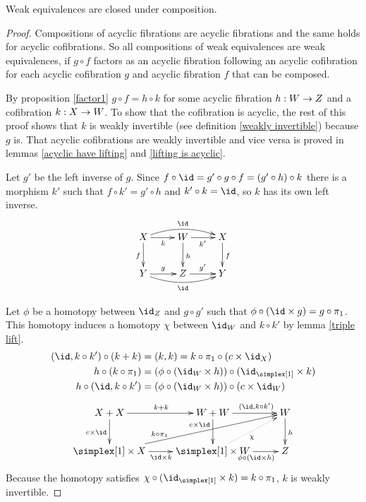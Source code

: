 \documentclass[csh.tex]{subfiles}
\begin{document}
\begin{lemma} Weak equivalences are closed under composition. \label{composition of weak equivalences}\end{lemma}

\begin{proof} Compositions of acyclic fibrations are acyclic fibrations and the same holds for acyclic cofibrations.
So all compositions of weak equivalences are weak equivalences, if $g\circ f$ factors as an acyclic fibration following an acyclic cofibration for each acyclic cofibration $g$ and acyclic fibration $f$ that can be composed.

By proposition \ref{factor1} $g\circ f=h\circ k$ for some acyclic fibration $h: W\to Z$ and a cofibration $k: X\to W$. To show that the cofibration is acyclic, the rest of this proof shows that $k$ is weakly invertible (see definition \ref{weakly invertible}) because $g$ is. That acyclic cofibrations are weakly invertible and vice versa is proved in lemmas \ref{acyclic have lifting} and \ref{lifting is acyclic}.

Let $g'$ be the left inverse of $g$. Since $f \circ \id = g'\circ g\circ f= (g'\circ h)\circ k$ there is a morphism $k'$ such that $f\circ k' = g'\circ h$ and $k'\circ k = \id$, so $k$ has its own left inverse.
\[\xymatrix{
X\ar[d]_f \ar[r]_{k} \ar@/^2ex/[rr]^{\id} & W\ar[d]^h \ar[r]_{k'} & X\ar[d]^f\\
Y \ar[r]^{g} \ar@/_2ex/[rr]_{\id} & Z \ar[r]^{g'} & Y
}\]

Let $\phi$ be a homotopy between $\id_Z$ and $g\circ g'$ such that $\phi\circ (\id\times g)=g\circ\pi_1$. This homotopy induces a homotopy $\chi$ between $\id_W$ and $k\circ k'$ by lemma \ref{triple lift}.
\begin{align*}
(\id, k\circ k')\circ (k+k) &= (k,k) = k\circ \pi_1\circ(c\times\id_X)\\
h\circ (k \circ \pi_1) &= (\phi\circ (\id_W\times h))\circ (\id_{\simplex[1]} \times k)\\
h\circ (\id, k\circ k') &= (\phi\circ (\id_W\times h))\circ (c\times \id_W)
\end{align*}
\[\xymatrix{
X+X\ar[d]_{c\times \id}\ar[r]^{k+k} & W+W\ar[d]_(.3){c\times \id}\ar[r]^(.6){(\id,k\circ k')} & W\ar[d]^h\\
\simplex[1]\times X\ar[r]_{\id\times k} \ar[urr]^(.3){k\circ \pi_1}  & \simplex[1]\times W\ar[r]_(.6){\phi\circ (\id\times h)} \ar@{.>}[ur]_\chi & Z
}\]
Because the homotopy satisfies $\chi\circ(\id_{\simplex[1]}\times k) = k\circ \pi_1$, $k$ is weakly invertible.
\end{proof}
\end{document}
